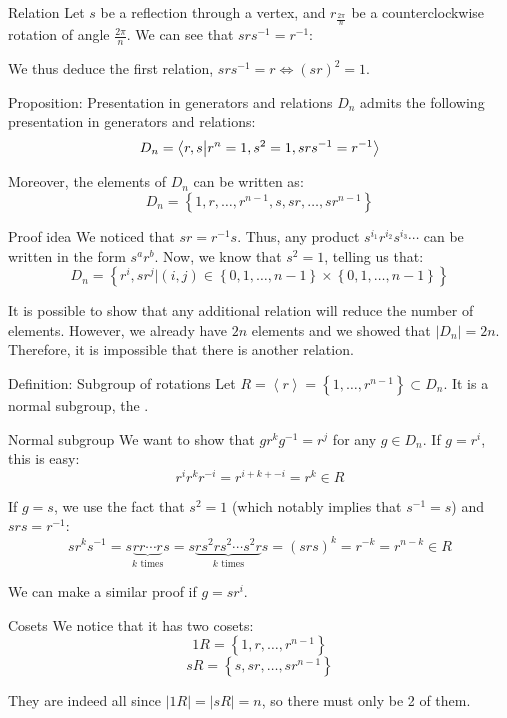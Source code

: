 \documentclass[a4paper]{article}
\begin{document}
\begin{parag}{Relation}
    Let $s$ be a reflection through a vertex, and $r_{\frac{2\pi}{n}}$ be a counterclockwise rotation of angle $\frac{2\pi}{n}$. We can see that $srs ^{-1} = r^{-1}$:

    We thus deduce the first relation, $srs ^{-1} = r \iff \left(sr\right)^2 = 1$.
\end{parag}

\begin{parag}{Proposition: Presentation in generators and relations}
    $D_n$ admits the following presentation in generators and relations: 
    \[D_n = \braket{r,s}{r^n = 1, s^2 = 1, srs ^{-1} = r^{-1}}\]

    Moreover, the elements of $D_n$ can be written as: 
    \[D_n = \left\{1, r, \ldots, r^{n-1}, s, sr, \ldots, sr^{n-1}\right\}\]

    \begin{subparag}{Proof idea}
        We noticed that $sr = r^{-1} s$. Thus, any product $s ^{i_1} r^{i_2} s ^{i_3} \cdots$ can be written in the form $s^a r^b$. Now, we know that $s^2 = 1$, telling us that: 
        \[D_n = \left\{r^i, s r^j | \left(i, j\right) \in \left\{0, 1, \ldots, n-1\right\} \times \left\{0, 1, \ldots, n-1\right\}\right\}\]
        
        It is possible to show that any additional relation will reduce the number of elements. However, we already have $2n$ elements and we showed that $\left|D_n\right| = 2n$. Therefore, it is impossible that there is another relation.
    \end{subparag}
\end{parag}

\begin{parag}{Definition: Subgroup of rotations}
    Let $R = \left\langle r \right\rangle = \left\{1, \ldots, r^{n-1}\right\} \subset D_n$. It is a normal subgroup, the .

    \begin{subparag}{Normal subgroup}
        We want to show that $g r^k g^{-1} = r^j$ for any $g \in D_n$. If $g = r^i$, this is easy: 
        \[r^{i} r^k r^{-i} = r^{i + k + -i} = r^k \in R\]
        
        If $g = s$, we use the fact that $s^2 = 1$ (which notably implies that $s ^{-1} = s$) and $s r s = r^{-1}$: 
        \[s  r^k s ^{-1} = s \underbrace{r r \cdots r}_{k \text{ times}} s = s \underbrace{r s^2 r s^2 \cdots s^2 r}_{k \text{ times}} s = \left(srs\right)^k = r^{-k} = r^{n -k}\in R\]

        We can make a similar proof if $g = s r^i$.
    \end{subparag}
    
    \begin{subparag}{Cosets}
        We notice that it has two cosets: 
        \[1R = \left\{1, r, \ldots, r^{n-1}\right\}\]
        \[sR = \left\{s, sr, \ldots, sr^{n-1}\right\}\]
        
        They are indeed all since $\left|1R\right| = \left|sR\right|= n$, so there must only be 2 of them.
    \end{subparag}
\end{parag}
\end{document}
